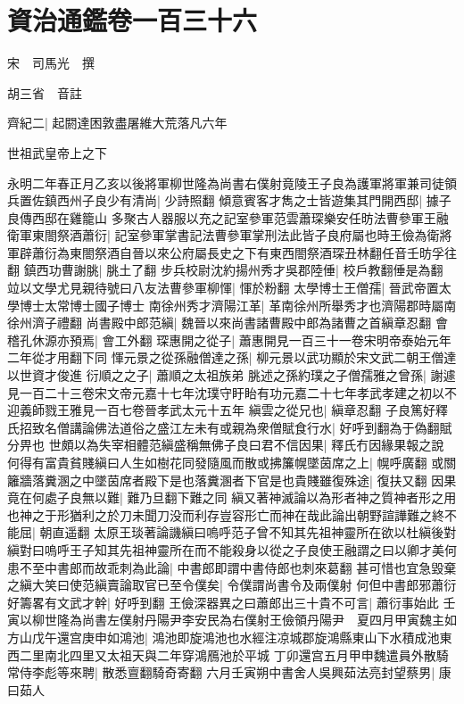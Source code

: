 \chapter{資治通鑑卷一百三十六}
宋　司馬光　撰

胡三省　音註

齊紀二|{
	起閼達困敦盡屠維大荒落凡六年}


世祖武皇帝上之下

永明二年春正月乙亥以後將軍柳世隆為尚書右僕射竟陵王子良為護軍將軍兼司徒領兵置佐鎮西州子良少有清尚|{
	少詩照翻}
傾意賓客才雋之士皆遊集其門開西邸|{
	據子良傳西邸在雞籠山}
多聚古人器服以充之記室參軍范雲蕭琛樂安任昉法曹參軍王融衛軍東閤祭酒蕭衍|{
	記室參軍掌書記法曹參軍掌刑法此皆子良府屬也時王儉為衛將軍辟蕭衍為東閤祭酒自晉以來公府屬長史之下有東西閤祭酒琛丑林翻任音壬昉孚往翻}
鎮西功曹謝朓|{
	朓土了翻}
步兵校尉沈約揚州秀才吳郡陸倕|{
	校戶教翻倕是為翻}
竝以文學尤見親待號曰八友法曹參軍柳惲|{
	惲於粉翻}
太學博士王僧孺|{
	晉武帝置太學博士太常博士國子博士}
南徐州秀才濟陽江革|{
	革南徐州所舉秀才也濟陽郡時屬南徐州濟子禮翻}
尚書殿中郎范縝|{
	魏晉以來尚書諸曹殿中郎為諸曹之首縝章忍翻}
會稽孔休源亦預焉|{
	會工外翻}
琛惠開之從子|{
	蕭惠開見一百三十一卷宋明帝泰始元年二年從才用翻下同}
惲元景之從孫融僧達之孫|{
	柳元景以武功顯於宋文武二朝王僧達以世資才俊進}
衍順之之子|{
	蕭順之太祖族弟}
朓述之孫約璞之子僧孺雅之曾孫|{
	謝遽見一百二十三卷宋文帝元嘉十七年沈璞守盱眙有功元嘉二十七年孝武孝建之初以不迎義師戮王雅見一百七卷晉孝武太元十五年}
縝雲之從兄也|{
	縝章忍翻}
子良篤好釋氏招致名僧講論佛法道俗之盛江左未有或親為衆僧賦食行水|{
	好呼到翻為于偽翻賦分畀也}
世頗以為失宰相體范縝盛稱無佛子良曰君不信因果|{
	釋氏冇因緣果報之說}
何得有富貴貧賤縝曰人生如樹花同發隨風而散或拂簾幌墜茵席之上|{
	幌呼廣翻}
或關籬牆落糞溷之中墜茵席者殿下是也落糞溷者下官是也貴賤雖復殊途|{
	復扶又翻}
因果竟在何處子良無以難|{
	難乃旦翻下難之同}
縝又著神滅論以為形者神之質神者形之用也神之于形猶利之於刀未聞刀没而利存豈容形亡而神在哉此論出朝野諠譁難之終不能屈|{
	朝直遥翻}
太原王琰著論譏縝曰嗚呼范子曾不知其先祖神靈所在欲以杜縝後對縝對曰嗚呼王子知其先祖神靈所在而不能殺身以從之子良使王融謂之曰以卿才美何患不至中書郎而故乖刺為此論|{
	中書郎即謂中書侍郎也刺來葛翻}
甚可惜也宜急毀棄之縝大笑曰使范縝賣論取官已至令僕矣|{
	令僕謂尚書令及兩僕射}
何但中書郎邪蕭衍好籌畧有文武才幹|{
	好呼到翻}
王儉深器異之曰蕭郎出三十貴不可言|{
	蕭衍事始此}
壬寅以柳世隆為尚書左僕射丹陽尹李安民為右僕射王儉領丹陽尹　夏四月甲寅魏主如方山戊午還宫庚申如鴻池|{
	鴻池即旋鴻池也水經注凉城郡旋鴻縣東山下水積成池東西二里南北四里又太祖天與二年穿鴻鴈池於平城}
丁卯還宫五月甲申魏遣員外散騎常侍李彪等來聘|{
	散悉亶翻騎奇寄翻}
六月壬寅朔中書舍人吳興茹法亮封望蔡男|{
	康曰茹人}


